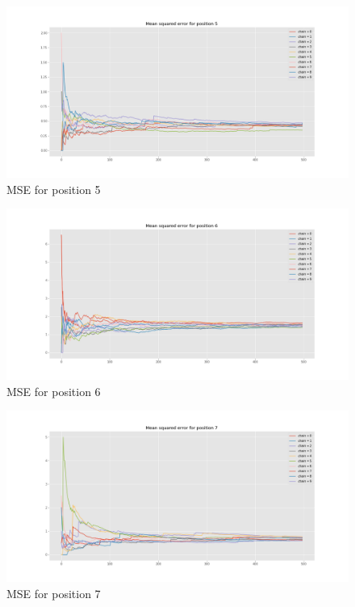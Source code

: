 \documentclass[]{article}
\begin{document}
	\begin{figure}[H]
		\begin{center}
			
			\includegraphics[width=1\textwidth]{task4/figures/T_2_4/Q2/mse_pos5.png}
			\caption*{MSE for position 5}
		\end{center}
	\end{figure}
	
	\begin{figure}[H]
		\begin{center}
			
			\includegraphics[width=1\textwidth]{task4/figures/T_2_4/Q2/mse_pos6.png}
			\caption*{MSE for position 6}
		\end{center}
	\end{figure}
	
	\begin{figure}[H]
		\begin{center}
			
			\includegraphics[width=1\textwidth]{task4/figures/T_2_4/Q2/mse_pos7.png}
			\caption*{MSE for position 7}
		\end{center}
	\end{figure}
	
\end{document}
